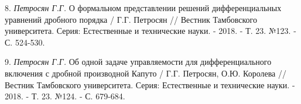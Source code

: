 8. {\it Петросян Г.Г.} О формальном представлении решений дифференциальных уравнений дробного порядка / Г.Г. Петросян // Вестник Тамбовского университета. Серия: Естественные и технические науки. -  2018. - Т. 23. №123. - С. 524-530.

9. {\it Петросян Г.Г.} Об одной задаче управляемости для дифференциального включения с дробной производной Капуто  / Г.Г. Петросян, О.Ю. Королева // Вестник Тамбовского университета. Серия: Естественные и технические науки. - 2018. - Т. 23. №124. - С. 679-684.











